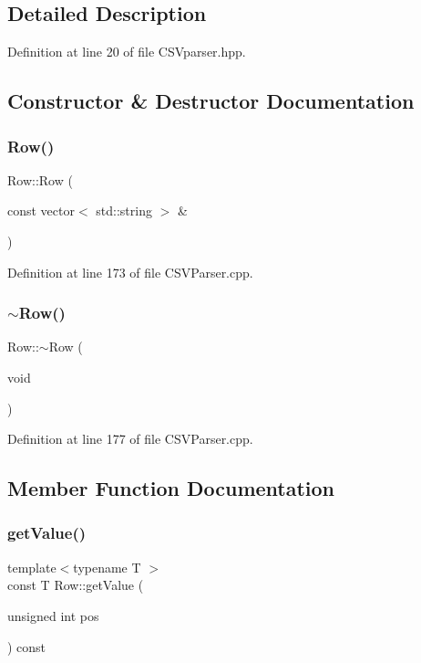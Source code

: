 \subsection{Detailed Description}


Definition at line 20 of file C\+S\+Vparser.\+hpp.



\subsection{Constructor \& Destructor Documentation}
\mbox{\label{class_row_a86c5a552052b35938a825ff0d0b66c70}} 
\subsubsection{Row()}
{\footnotesize\ttfamily Row\+::\+Row (\begin{DoxyParamCaption}\item[{const vector$<$ std\+::string $>$ \&}]{ }\end{DoxyParamCaption})}



Definition at line 173 of file C\+S\+V\+Parser.\+cpp.

\mbox{\label{class_row_a671be9f718722eccb2d3121f1579733e}} 
\subsubsection{$\sim$\+Row()}
{\footnotesize\ttfamily Row\+::$\sim$\+Row (\begin{DoxyParamCaption}\item[{void}]{ }\end{DoxyParamCaption})}



Definition at line 177 of file C\+S\+V\+Parser.\+cpp.



\subsection{Member Function Documentation}
\mbox{\label{class_row_a06931bff452df5a451da2268423bb6ea}} 
\subsubsection{get\+Value()}
{\footnotesize\ttfamily template$<$typename T $>$ \\
const T Row\+::get\+Value (\begin{DoxyParamCaption}\item[{unsigned int}]{pos }\end{DoxyParamCaption}) const\hspace{0.3cm}{\ttfamily [inline]}}



